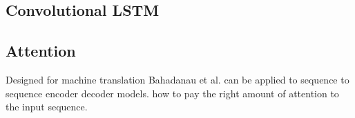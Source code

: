 \subsection{Convolutional LSTM}

\subsection{Attention}
Designed for machine translation Bahadanau et al. can be applied to sequence to sequence encoder decoder models.
how to pay the right amount of attention to the input sequence.